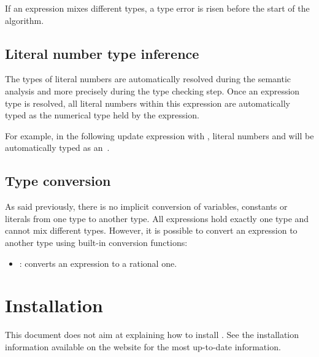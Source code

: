 If an expression mixes different types, a type error is risen before the start of the algorithm.


\subsection{Literal number type inference}

The types of literal numbers are automatically resolved during the semantic analysis and more precisely during the type checking step.
Once an expression type is resolved, all literal numbers within this expression are automatically typed as the numerical type held by the expression.

For example, in the following update expression  with , literal numbers  and  will be automatically typed as an~.

\subsection{Type conversion}

As said previously, there is no implicit conversion of variables, constants or literals from one type to another type. All expressions hold exactly one type and cannot mix different types. However, it is possible to convert an expression to another type using built-in conversion functions:

\begin{itemize}
	\item {}: converts an  expression to a rational one.
\end{itemize}



\section{Installation}

This document does not aim at explaining how to install \imitator{}.
See the installation information available on the website for the most up-to-date information.

